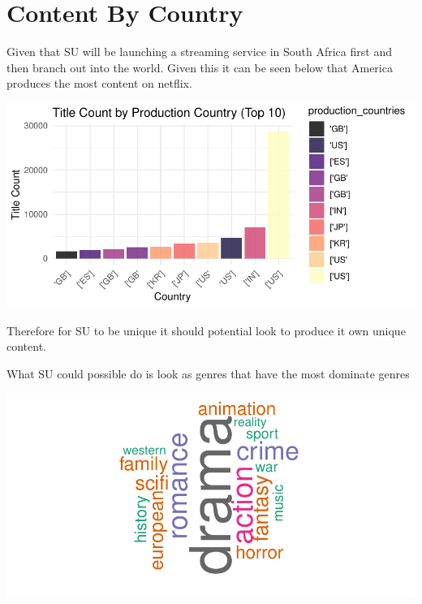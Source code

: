 \documentclass[12pt,preprint, authoryear]{elsarticle}
\let\origfigure\figure
\let\endorigfigure\endfigure
\renewenvironment{figure}[1][2] {
    \expandafter\origfigure\expandafter[H]
} {
    \endorigfigure
}
\numberwithin{equation}{section}
\numberwithin{figure}{section}
\numberwithin{table}{section}
\begin{document}
\hypertarget{content-by-country}{%
\section{Content By Country}\label{content-by-country}}

Given that SU will be launching a streaming service in South Africa
first and then branch out into the world. Given this it can be seen
below that America produces the most content on netflix.

\begin{figure}[H]

{\centering \includegraphics{Q4_files/figure-latex/Figure8-1} 

}

\caption{Content Produced by Country \label{Figure1}}\label{fig:Figure8}
\end{figure}

Therefore for SU to be unique it should potential look to produce it own
unique content.

What SU could possible do is look as genres that have the most dominate
genres

\begin{figure}[H]

{\centering \includegraphics{Q4_files/figure-latex/Figure9-1} 

}

\caption{Word cloud most dominate genres \label{Figure2}}\label{fig:Figure9}
\end{figure}
\end{document}
